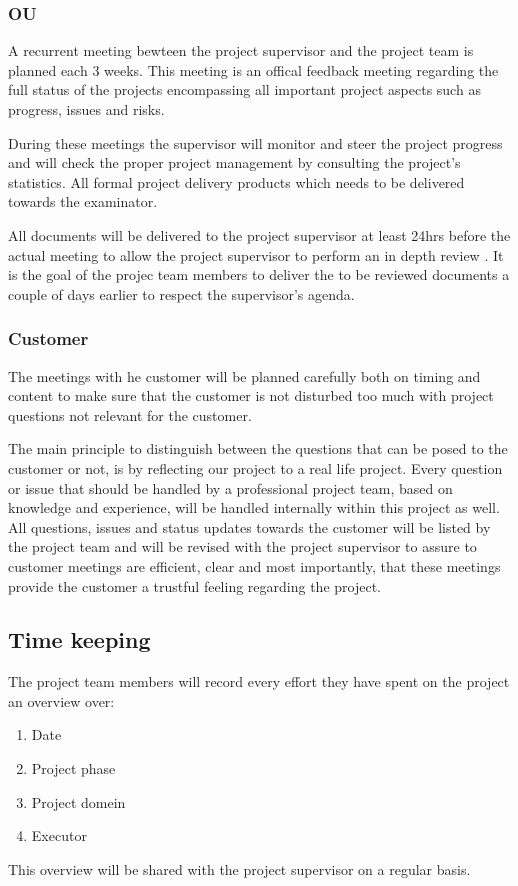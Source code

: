 \subsubsection{OU}
A recurrent meeting bewteen the project supervisor and the project team is planned each 3 weeks.
This meeting is an offical feedback meeting regarding the full status of the projects encompassing all important project aspects such as progress, issues and risks. 

During these meetings the supervisor will monitor and steer the project progress and will check the proper project management by consulting the project's statistics. All formal project delivery products which needs to be delivered towards the examinator. 

All documents will be delivered to the project supervisor at least 24hrs before the actual meeting to allow the project supervisor to perform an in depth review .
It is the goal of the projec team members to deliver the to be reviewed documents a couple of days earlier to respect the supervisor's agenda.

\subsubsection{Customer}
The meetings with he customer will be planned carefully both on timing and content to make sure that the customer is not disturbed too much with project questions not relevant for the customer. 

The main principle to distinguish between the questions that can be posed to the customer or not, is by reflecting our project to a real life project. 
Every question or issue that should be handled by a professional project team, based on knowledge and experience, will be handled internally within this project as well.
All questions, issues and status updates towards the customer will be listed by the project team and will be revised with the project supervisor to assure to customer meetings are efficient, clear and most importantly, that these meetings provide the customer a trustful feeling regarding the project.
\subsection{Time keeping}
The project team members will record every effort they have spent on the project an overview over:
\begin{enumerate}
	\item Date
	\item Project phase
	\item Project domein
	\item Executor
\end {enumerate}
This overview will be shared with the project supervisor on a regular basis.
